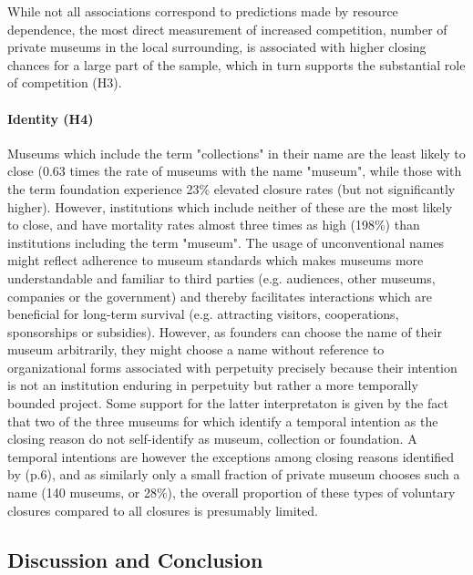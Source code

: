 \documentclass[12pt]{article}
\begin{document}
While not all associations correspond to predictions made by resource dependence, the most direct measurement of increased competition, number of private museums in the local surrounding, is associated with higher closing chances for a large part of the sample, which in turn supports the substantial role of competition (H3).
\paragraph*{Identity (H4)}


Museums which include the term "collections" in their name are the least likely to close (0.63 times the rate of museums with the name "museum", while those with the term foundation experience 23\% elevated closure rates (but not significantly higher).
However, institutions which include neither of these are the most likely to close, and have mortality rates almost three times as high (198\%) than institutions including the term "museum".
The usage of unconventional names might reflect adherence to museum standards which makes museums more understandable and familiar to third parties (e.g. audiences, other museums, companies or the government) and thereby facilitates interactions which are beneficial for long-term survival (e.g. attracting visitors, cooperations, sponsorships or subsidies).
However, as founders can choose the name of their museum arbitrarily, they might choose a name without reference to organizational forms associated with perpetuity precisely because their intention is not an institution enduring in perpetuity but rather a more temporally bounded project.
Some support for the latter interpretaton is given by the fact that two of the three museums for which \textcite{Velthuis_Gera_2024_fragility} identify a temporal intention as the closing reason do not self-identify as museum, collection or foundation.
A temporal intentions are however the exceptions among closing reasons identified by \textcite{Velthuis_Gera_2024_fragility} (p.6), and as similarly only a small fraction of private museum chooses such a name (140 museums, or 28\%), the overall proportion of these types of voluntary closures compared to all closures is presumably limited.
\subsection*{Discussion and Conclusion}
\end{document}
